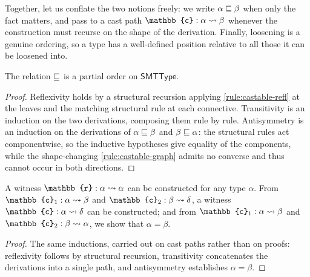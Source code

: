 Together,  let us conflate the two notions freely: we write $\alpha \sqsubseteq \beta$ when only the fact matters, and pass to a cast path $\mathbb{c} : \castpath{\alpha}{\beta}$ whenever the construction must recurse on the shape of the derivation. Finally, loosening is a genuine ordering, so a type has a well-defined position relative to all those it can be loosened into.

\begin{theorem}
  \label{thm:loosening-partial-order}
  The relation $ \sqsubseteq $ is a partial order on $\mathsf{SMTType}$.
\end{theorem}
\begin{proof}
Reflexivity holds by a structural recursion applying \cref{rule:castable-refl} at the leaves and the matching structural rule at each connective. Transitivity is an induction on the two derivations, composing them rule by rule. Antisymmetry is an induction on the derivations of $\alpha \sqsubseteq \beta$ and $\beta \sqsubseteq \alpha$: the structural rules act componentwise, so the inductive hypotheses give equality of the components, while the shape-changing \cref{rule:castable-graph} admits no converse and thus cannot occur in both directions.
\end{proof}

\begin{corollary}
  A witness \(\mathbb{r} : \castpath{\alpha}{\alpha}\) can be constructed for any type \(\alpha\).
  From $\mathbb{c}_1 : \castpath{\alpha}{\beta}$ and $\mathbb{c}_2 : \castpath{\beta}{\delta}$, a witness $\mathbb{c} : \castpath{\alpha}{\delta}$ can be constructed; and from $\mathbb{c}_1 : \castpath{\alpha}{\beta}$ and $\mathbb{c}_2 : \castpath{\beta}{\alpha}$, we show that $\alpha = \beta$.
\end{corollary}
\begin{proof}
The same inductions, carried out on cast paths rather than on proofs: reflexivity follows by structural recursion,
transitivity concatenates the derivations into a single path, and antisymmetry establishes $\alpha = \beta$.
\end{proof}

